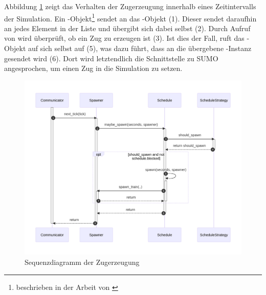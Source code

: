 Abbildung \ref{fig:spawner-seq} zeigt das Verhalten der Zugerzeugung innerhalb eines Zeitintervalls der Simulation. Ein -Objekt\footnote{beschrieben in der Arbeit von \citeauthor{kamp_architektur_2023}\cite{kamp_architektur_2023}} sendet  an das -Objekt (1). Dieser sendet daraufhin  an jedes Element in der Liste  und übergibt sich dabei selbst (2). Durch Aufruf von  wird überprüft, ob ein Zug zu erzeugen ist (3). Ist dies der Fall, ruft das -Objekt auf sich selbst  auf (5), was dazu führt, dass  an die übergebene -Instanz gesendet wird (6). Dort wird letztendlich die Schnittstelle zu SUMO angesprochen, um einen Zug in die Simulation zu setzen.

\begin{figure}[H]
	\centering
	\includegraphics[width=1.0\linewidth]{images/diagrams/spawner-seq.png}
	\caption{Sequenzdiagramm der Zugerzeugung}
	\label{fig:spawner-seq}
\end{figure}

